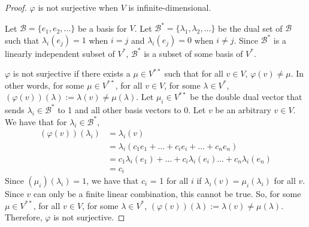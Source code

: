 \begin{proof} $\varphi$ is not surjective when $V$ is infinite-dimensional. \gap

    Let $\mathcal{B} = \{e_1, e_2,...\}$ be a basis for $V$.
    Let $\mathcal{B}^* = \{\lambda_1, \lambda_2,... \}$ be the dual set of $\mathcal{B}$
    such that $\lambda_i(e_j) = 1$ when $i=j$ and $\lambda_i(e_j) = 0$ when $i \neq j$.
    Since $\mathcal{B^*}$ is a linearly independent subset of $V^*$, 
    $\mathcal{B}^*$ is a subset of some basis of $V^*$.\gap
    

    $\varphi$ is not surjective if there exists a $\mu \in V^{**}$
    such that for all $v \in V$, $\varphi(v) \neq \mu$.
    In other words, for some $\mu \in V^{**}$, for all $v \in V$, for some $\lambda \in V^*$,
    $(\varphi(v))(\lambda) := \lambda(v) \neq \mu(\lambda)$.
    Let $\mu_i \in V^{**}$ be the double dual vector
    that sends $\lambda_i \in \mathcal{B}^*$ to 1
    and all other basis vectors to 0.
    Let $v$ be an arbitrary $v \in V$. 
    We have that for $\lambda_i \in \mathcal{B}^*$,
    \begin{align}
        (\varphi(v))(\lambda_i)
        &= \lambda_i(v)\\
        &= \lambda_i(c_1e_1 + ... + c_ie_i + ... + c_ne_n)\\
        &= c_1\lambda_i(e_1) + ... + c_i\lambda_i(e_i)... + c_n\lambda_i(e_n)\\
        &= c_i
    \end{align}
    Since $(\mu_i)(\lambda_i) = 1$,
    we have that $c_i$ = 1 for all $i$ if $\lambda_i(v) = \mu_i(\lambda_i)$ for all $v$.
    Since $v$ can only be a finite linear combination, this cannot be true.
    So, for some $\mu \in V^{**}$, for all $v \in V$, for some $\lambda \in V^*$,
    $(\varphi(v))(\lambda) := \lambda(v) \neq \mu(\lambda)$.
    Therefore, $\varphi$ is not surjective.

\end{proof}